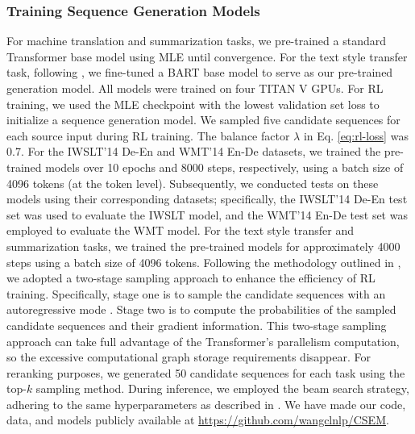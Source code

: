 \documentclass[lettersize,journal]{IEEEtran}
\begin{document}
\subsubsection{Training Sequence Generation Models}
For machine translation and summarization tasks, we pre-trained a standard Transformer base model \cite{vaswani2017attention} using MLE until convergence.
For the text style transfer task, following \cite{lai2021thank}, we fine-tuned a BART base model \cite{lewis2019bart} to serve as our pre-trained generation model.
All models were trained on four TITAN V GPUs.
For RL training, we used the MLE checkpoint with the lowest validation set loss to initialize a sequence generation model.
We sampled five candidate sequences for each source input during RL training.
The balance factor $\lambda$ in Eq. \ref{eq:rl-loss} was 0.7.
For the IWSLT'14 De-En and WMT'14 En-De datasets, we trained the pre-trained models over 10 epochs and 8000 steps, respectively, using a batch size of 4096 tokens (at the token level). Subsequently, we conducted tests on these models using their corresponding datasets; specifically, the IWSLT’14 De-En test set was used to evaluate the IWSLT model, and the WMT’14 En-De test set was employed to evaluate the WMT model.
For the text style transfer and summarization tasks, we trained the pre-trained models for approximately 4000 steps using a batch size of 4096 tokens. Following the methodology outlined in \cite{wang2023esrl}, we adopted a two-stage sampling approach to enhance the efficiency of RL training. Specifically, stage one is to sample the candidate sequences with an autoregressive mode \cite{xiao2023introduction}. Stage two is to compute the probabilities of the sampled candidate sequences and their gradient information. This two-stage sampling approach can take full advantage of the Transformer’s parallelism computation, so the excessive computational graph storage requirements disappear.
For reranking purposes, we generated 50 candidate sequences for each task using the top-$k$ sampling method. During inference, we employed the beam search strategy, adhering to the same hyperparameters as described in \cite{li2022ode}.  We have made our code, data, and models publicly available at \url{https://github.com/wangclnlp/CSEM}.





\end{document}
